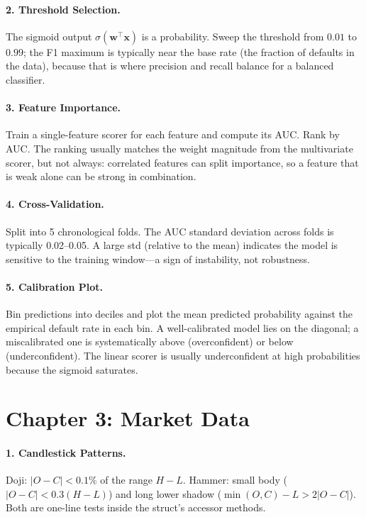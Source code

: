 \paragraph{2. Threshold Selection.}
The sigmoid output $\sigma(\mathbf{w}^\top \mathbf{x})$ is a
probability. Sweep the threshold from $0.01$ to $0.99$; the F1
maximum is typically near the base rate (the fraction of defaults
in the data), because that is where precision and recall balance
for a balanced classifier.

\paragraph{3. Feature Importance.}
Train a single-feature scorer for each feature and compute its AUC.
Rank by AUC. The ranking usually matches the weight magnitude from
the multivariate scorer, but not always: correlated features can
split importance, so a feature that is weak alone can be strong in
combination.

\paragraph{4. Cross-Validation.}
Split into 5 chronological folds. The AUC standard deviation across
folds is typically 0.02--0.05. A large std (relative to the mean)
indicates the model is sensitive to the training window---a sign of
instability, not robustness.

\paragraph{5. Calibration Plot.}
Bin predictions into deciles and plot the mean predicted probability
against the empirical default rate in each bin. A well-calibrated
model lies on the diagonal; a miscalibrated one is systematically
above (overconfident) or below (underconfident). The linear scorer
is usually underconfident at high probabilities because the sigmoid
saturates.

\section*{Chapter 3: Market Data}

\paragraph{1. Candlestick Patterns.}
Doji: $|O - C| < 0.1\%$ of the range $H - L$. Hammer: small body
($|O - C| < 0.3 (H - L)$) and long lower shadow
($\min(O, C) - L > 2 |O - C|$). Both are one-line tests inside the
 struct's accessor methods.

